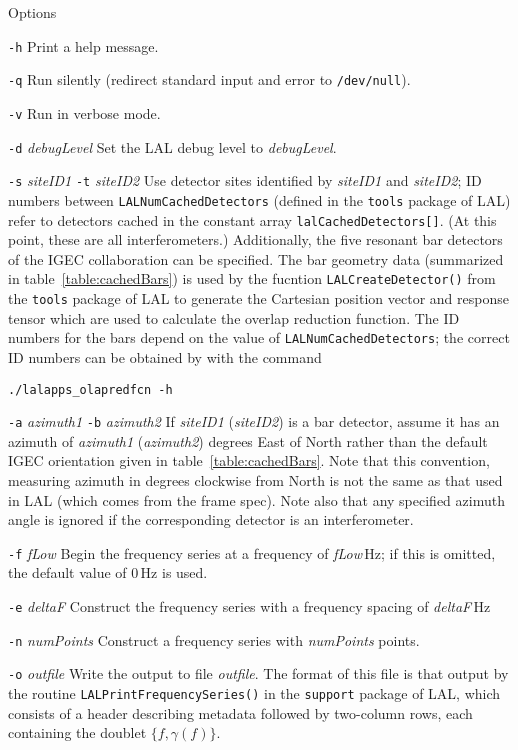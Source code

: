 \begin{entry}
\item[Options]\leavevmode
\begin{entry}
\item[\texttt{-h}]
  Print a help message.
\item[\texttt{-q}]
  Run silently (redirect standard input and error to \texttt{/dev/null}).
\item[\texttt{-v}]
  Run in verbose mode.
\item[\texttt{-d} \textit{debugLevel}]
  Set the LAL debug level to \textit{debugLevel}.
\item[\texttt{-s} \textit{siteID1} \texttt{-t} \textit{siteID2}]
  Use detector sites identified by \textit{siteID1} and
  \textit{siteID2}; ID numbers between \texttt{LALNumCachedDetectors}
  (defined in the \texttt{tools} package of LAL) refer to detectors
  cached in the constant array \verb$lalCachedDetectors[]$.  (At this
  point, these are all interferometers.)  Additionally, the five
  resonant bar detectors of the IGEC collaboration can be specified.
  The bar geometry data (summarized in table~\ref{table:cachedBars})
  is used by the fucntion \verb$LALCreateDetector()$ from the
  \texttt{tools} package of LAL to generate the Cartesian position
  vector and response tensor which are used to calculate the overlap
  reduction function.  The ID numbers for the bars depend on the value
  of \texttt{LALNumCachedDetectors}; the correct ID numbers can be
  obtained by with the command
\begin{verbatim}
./lalapps_olapredfcn -h
\end{verbatim}
\item[\texttt{-a} \textit{azimuth1} \texttt{-b} \textit{azimuth2}]
%
  If \textit{siteID1} (\textit{siteID2}) is a bar detector, assume it
  has an azimuth of \textit{azimuth1} (\textit{azimuth2}) degrees East
  of North rather than the default IGEC orientation given in
  table~\ref{table:cachedBars}.  Note that this convention, measuring
  azimuth in degrees clockwise from North is not the same as that used
  in LAL (which comes from the frame spec).  Note also that any
  specified azimuth angle is ignored if the corresponding detector is
  an interferometer.
\item[\texttt{-f} \textit{fLow}]
  Begin the frequency series at a frequency of \textit{fLow}\,Hz; if this
  is omitted, the default value of 0\,Hz is used.
\item[\texttt{-e} \textit{deltaF}]
  Construct the frequency series with a frequency spacing of
  \textit{deltaF}\,Hz
\item[\texttt{-n} \textit{numPoints}]
  Construct a frequency series with \textit{numPoints} points.
\item[\texttt{-o} \textit{outfile}]
  Write the output to file \textit{outfile}.  The format of this file
  is that output by the routine \verb$LALPrintFrequencySeries()$ in
  the \texttt{support} package of LAL, which consists of a header
  describing metadata followed by two-column rows, each containing the
  doublet $\{f,\gamma(f)\}$.
\end{entry}


\end{entry}
